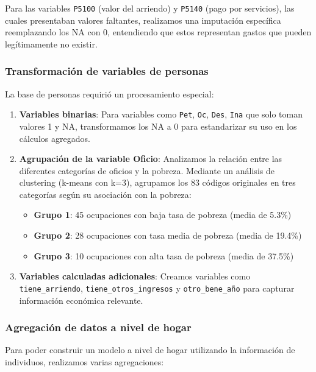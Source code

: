 \documentclass[12pt,a4paper,onecolumn]{article}
\begin{document}
Para las variables \texttt{P5100} (valor del arriendo) y \texttt{P5140} (pago por servicios), las cuales presentaban valores faltantes, realizamos una imputación específica reemplazando los NA con 0, entendiendo que estos representan gastos que pueden legítimamente no existir.

\subsubsection{Transformación de variables de personas}

La base de personas requirió un procesamiento especial:

\begin{enumerate}
   \item \textbf{Variables binarias}: Para variables como \texttt{Pet}, \texttt{Oc}, \texttt{Des}, \texttt{Ina} que solo toman valores 1 y NA, transformamos los NA a 0 para estandarizar su uso en los cálculos agregados.

   \item \textbf{Agrupación de la variable Oficio}: Analizamos la relación entre las diferentes categorías de oficios y la pobreza. Mediante un análisis de clustering (k-means con k=3), agrupamos los 83 códigos originales en tres categorías según su asociación con la pobreza:
   \begin{itemize}
       \item \textbf{Grupo 1}: 45 ocupaciones con baja tasa de pobreza (media de 5.3\%)
       \item \textbf{Grupo 2}: 28 ocupaciones con tasa media de pobreza (media de 19.4\%)
       \item \textbf{Grupo 3}: 10 ocupaciones con alta tasa de pobreza (media de 37.5\%)
   \end{itemize}

   \item \textbf{Variables calculadas adicionales}: Creamos variables como \texttt{tiene\_arriendo}, \texttt{tiene\_otros\_ingresos} y \texttt{otro\_bene\_año} para capturar información económica relevante.
\end{enumerate}

\subsubsection{Agregación de datos a nivel de hogar}

Para poder construir un modelo a nivel de hogar utilizando la información de individuos, realizamos varias agregaciones:
\end{document}
